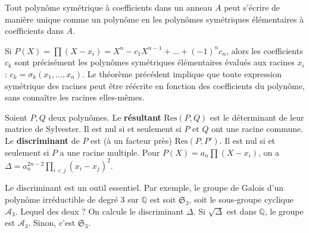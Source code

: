 \begin{theorem}
    Tout polynôme symétrique à coefficients dans un anneau $A$ peut s'écrire de manière unique comme un polynôme en les polynômes symétriques élémentaires à coefficients dans $A$.
\end{theorem}

\begin{remark}
    Si $P(X) = \prod (X-x_i) = X^n - c_1 X^{n-1} + \dots + (-1)^n c_n$, alors les coefficients $c_k$ sont précisément les polynômes symétriques élémentaires évalués aux racines $x_i$ : $c_k = \sigma_k(x_1, \dots, x_n)$. Le théorème précédent implique que toute expression symétrique des racines peut être réécrite en fonction des coefficients du polynôme, sans connaître les racines elles-mêmes.
\end{remark}

\begin{definition}
    Soient $P, Q$ deux polynômes. Le \textbf{résultant} $\mathrm{Res}(P,Q)$ est le déterminant de leur matrice de Sylvester. Il est nul si et seulement si $P$ et $Q$ ont une racine commune.
    Le \textbf{discriminant} de $P$ est (à un facteur près) $\mathrm{Res}(P, P')$. Il est nul si et seulement si $P$ a une racine multiple. Pour $P(X) = a_n \prod (X-x_i)$, on a $\Delta = a_n^{2n-2} \prod_{i<j} (x_i-x_j)^2$.
\end{definition}

\begin{application}
    Le discriminant est un outil essentiel. Par exemple, le groupe de Galois d'un polynôme irréductible de degré 3 sur $\mathbb{Q}$ est soit $\mathfrak{S}_3$, soit le sous-groupe cyclique $\mathcal{A}_3$. Lequel des deux ? On calcule le discriminant $\Delta$. Si $\sqrt{\Delta}$ est dans $\mathbb{Q}$, le groupe est $\mathcal{A}_3$. Sinon, c'est $\mathfrak{S}_3$.
\end{application}